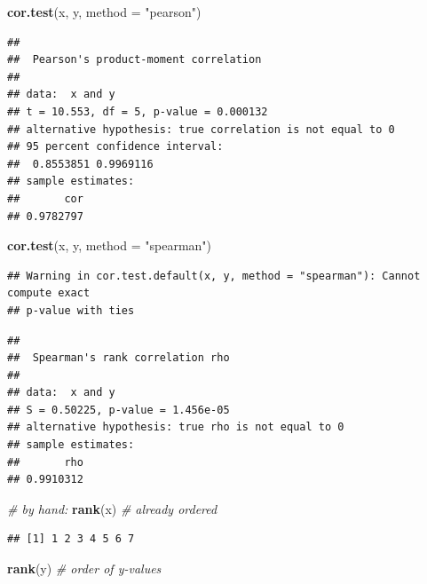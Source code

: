 \documentclass[
]{book}
\newenvironment{Shaded}{\begin{snugshade}}{\end{snugshade}}
\newcommand{\AttributeTok}[1]{\textcolor[rgb]{0.13,0.29,0.53}{#1}}
\newcommand{\CommentTok}[1]{\textcolor[rgb]{0.56,0.35,0.01}{\textit{#1}}}
\newcommand{\FunctionTok}[1]{\textcolor[rgb]{0.13,0.29,0.53}{\textbf{#1}}}
\newcommand{\NormalTok}[1]{#1}
\newcommand{\StringTok}[1]{\textcolor[rgb]{0.31,0.60,0.02}{#1}}
\begin{document}
\begin{Shaded}
\begin{Highlighting}[]
\FunctionTok{cor.test}\NormalTok{(x, y, }\AttributeTok{method =} \StringTok{"pearson"}\NormalTok{)}
\end{Highlighting}
\end{Shaded}

\begin{verbatim}
## 
##  Pearson's product-moment correlation
## 
## data:  x and y
## t = 10.553, df = 5, p-value = 0.000132
## alternative hypothesis: true correlation is not equal to 0
## 95 percent confidence interval:
##  0.8553851 0.9969116
## sample estimates:
##       cor 
## 0.9782797
\end{verbatim}

\begin{Shaded}
\begin{Highlighting}[]
\FunctionTok{cor.test}\NormalTok{(x, y, }\AttributeTok{method =} \StringTok{"spearman"}\NormalTok{)}
\end{Highlighting}
\end{Shaded}

\begin{verbatim}
## Warning in cor.test.default(x, y, method = "spearman"): Cannot compute exact
## p-value with ties
\end{verbatim}

\begin{verbatim}
## 
##  Spearman's rank correlation rho
## 
## data:  x and y
## S = 0.50225, p-value = 1.456e-05
## alternative hypothesis: true rho is not equal to 0
## sample estimates:
##       rho 
## 0.9910312
\end{verbatim}

\begin{Shaded}
\begin{Highlighting}[]
\CommentTok{\# by hand:}
\FunctionTok{rank}\NormalTok{(x) }\CommentTok{\# already ordered}
\end{Highlighting}
\end{Shaded}

\begin{verbatim}
## [1] 1 2 3 4 5 6 7
\end{verbatim}

\begin{Shaded}
\begin{Highlighting}[]
\FunctionTok{rank}\NormalTok{(y) }\CommentTok{\# order of y{-}values}
\end{Highlighting}
\end{Shaded}
\end{document}
